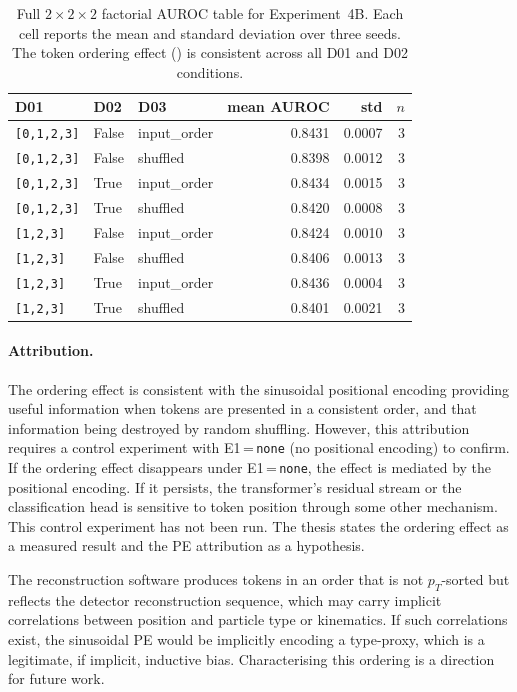 \begin{table}[h]
\centering
\small
\begin{tabular}{lllrrr}
\toprule
D01 & D02 & D03 & mean AUROC & std & $n$ \\
\midrule
\texttt{[0,1,2,3]} & False & input\_order & 0.8431 & 0.0007 & 3 \\
\texttt{[0,1,2,3]} & False & shuffled     & 0.8398 & 0.0012 & 3 \\
\texttt{[0,1,2,3]} & True  & input\_order & 0.8434 & 0.0015 & 3 \\
\texttt{[0,1,2,3]} & True  & shuffled     & 0.8420 & 0.0008 & 3 \\
\texttt{[1,2,3]}   & False & input\_order & 0.8424 & 0.0010 & 3 \\
\texttt{[1,2,3]}   & False & shuffled     & 0.8406 & 0.0013 & 3 \\
\texttt{[1,2,3]}   & True  & input\_order & 0.8436 & 0.0004 & 3 \\
\texttt{[1,2,3]}   & True  & shuffled     & 0.8401 & 0.0021 & 3 \\
\bottomrule
\end{tabular}
\caption{Full $2\times2\times2$ factorial AUROC table for Experiment~4B.
Each cell reports the mean and standard deviation over three seeds.
The token ordering effect () is consistent across all D01 and D02 conditions.}
\label{tab:exp4b-d02d03}
\end{table}

\paragraph{Attribution.}
The ordering effect is consistent with the sinusoidal positional encoding providing useful information when tokens are presented in a consistent order, and that information being destroyed by random shuffling.
However, this attribution requires a control experiment with E1\,=\,\texttt{none} (no positional encoding) to confirm.
If the ordering effect disappears under E1\,=\,\texttt{none}, the effect is mediated by the positional encoding.
If it persists, the transformer's residual stream or the classification head is sensitive to token position through some other mechanism.
This control experiment has not been run.
The thesis states the ordering effect as a measured result and the PE attribution as a hypothesis.

The reconstruction software produces tokens in an order that is not $p_T$-sorted but reflects the detector reconstruction sequence, which may carry implicit correlations between position and particle type or kinematics.
If such correlations exist, the sinusoidal PE would be implicitly encoding a type-proxy, which is a legitimate, if implicit, inductive bias.
Characterising this ordering is a direction for future work.

